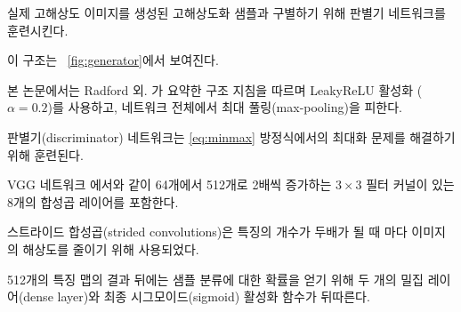 \documentclass[10pt,twocolumn,letterpaper]{article}
\newcommand{\kor}[1]{#1}
\newcommand{\eng}[1]{}
\newcommand{\summary}[1]{}
\begin{document}
\eng{
To discriminate real \ac{HR} images from generated \ac{SR} samples we train a discriminator network.
}\kor{
실제 \ac{고해상도} 이미지를 생성된 고해상도화 샘플과 구별하기 위해 판별기 네트워크를 훈련시킨다.
} \eng{
The architecture is shown in \figurename~\ref{fig:generator}.
}\kor{
이 구조는 \figurename~\ref{fig:generator}에서 보여진다.
}
\eng{
We follow the architectural guidelines summarized by Radford et al. \cite{Radford2015} and use LeakyReLU activation ($\alpha=0.2$) and avoid max-pooling throughout the network.
}\kor{
본 논문에서는 Radford 외. \cite{Radford2015}가 요약한 구조 지침을 따르며 LeakyReLU 활성화 ($\alpha=0.2$)를 사용하고, 네트워크 전체에서 최대 풀링(max-pooling)을 피한다.
} \eng{
The discriminator network is trained to solve the maximization problem in Equation \ref{eq:minmax}.
}\kor{
판별기(discriminator) 네트워크는 \ref{eq:minmax} 방정식에서의 최대화 문제를 해결하기 위해 훈련된다.
} \eng{
It contains eight convolutional layers with an increasing number of $3\times3$ filter kernels, increasing by a factor of 2 from 64 to 512 kernels as in the VGG network \cite{simonyan2014very}.
}\kor{
VGG 네트워크 \cite{simonyan2014very}에서와 같이 64개에서 512개로 2배씩 증가하는 $3\times3$ 필터 커널이 있는 8개의 합성곱 레이어를 포함한다.
} \eng{
Strided convolutions are used to reduce the image resolution each time the number of features is doubled.
}\kor{
스트라이드 합성곱(strided convolutions)은 특징의 개수가 두배가 될 때 마다 이미지의 해상도를 줄이기 위해 사용되었다.
} \eng{
The resulting 512 feature maps are followed by two dense layers and a final sigmoid activation function to obtain a probability for sample classification.
}\kor{
512개의 특징 맵의 결과 뒤에는 샘플 분류에 대한 확률을 얻기 위해 두 개의 밀집 레이어(dense layer)와 최종 시그모이드(sigmoid) 활성화 함수가 뒤따른다.
}

\summary{
실제 이미지와 생성된 고해상도화 샘플을 구별하기 위해 판별기 네트워크를 훈련하며, 판별기 네트워크는 8개의 합성곱 레이어(64 → 512, 2배씩 증가, 3 × 3 필터 커널)와 스트라이드 합성곱, 두개의 밀집 레이어와 시그모이드 활성화 함수를 사용하여 구성하였음.
}
\end{document}
